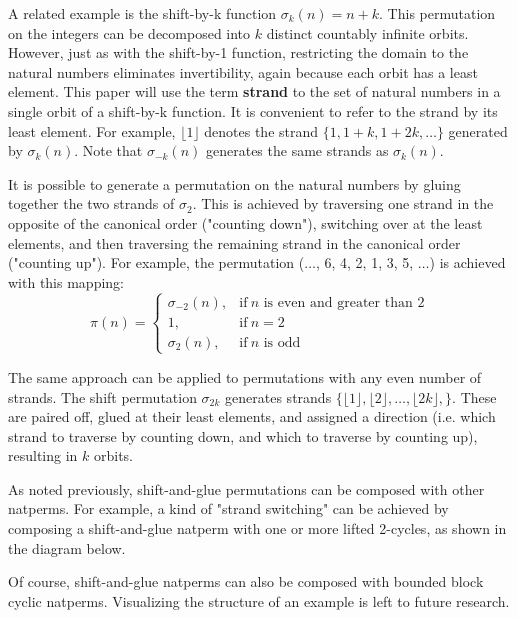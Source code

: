 \documentclass[12pt,reqno]{article}
\begin{document}
A related example is the shift-by-k function $\sigma_k(n) = n + k$. This permutation on the integers can be decomposed into $k$ distinct countably infinite orbits. However, just as with the shift-by-1 function, restricting the domain to the natural numbers eliminates invertibility, again because each orbit has a least element. This paper will use the term \textbf{strand} to the set of natural numbers in a single orbit of a shift-by-k function. It is convenient to refer to the strand by its least element. For example, $\lfloor 1 \rfloor$ denotes the strand $\{ 1, 1 + k, 1 + 2k, \ldots \}$ generated by $\sigma_k(n)$. Note that $\sigma_{-k}(n)$ generates the same strands as $\sigma_k(n)$.

It is possible to generate a permutation on the natural numbers by gluing together the two strands of $\sigma_2$. This is achieved by traversing one strand in the opposite of the canonical order ("counting down"), switching over at the least elements, and then traversing the remaining strand in the canonical order ("counting up"). For example, the permutation ($\ldots$, 6, 4, 2, 1, 3, 5, $\ldots$) is achieved with this mapping:
\begin{equation}
    \pi(n) = \begin{cases}
        \sigma_{-2}(n), & \text{if}\ n \text{ is even and greater than 2} \\
        1, & \text{if}\ n = 2 \\
        \sigma_2(n), & \text{if}\ n \text{ is odd} 
    \end{cases}
\end{equation}

The same approach can be applied to permutations with any even number of strands. The shift permutation $\sigma_{2k}$ generates strands $\{ \lfloor 1 \rfloor,  \lfloor 2 \rfloor, \ldots, \lfloor 2k \rfloor, \}$. These are paired off, glued at their least elements, and assigned a direction (i.e. which strand to traverse by counting down, and which to traverse by counting up), resulting in $k$ orbits.


As noted previously, shift-and-glue permutations can be composed with other natperms. For example, a kind of "strand switching" can be achieved by composing a shift-and-glue natperm with one or more lifted 2-cycles, as shown in the diagram below.


Of course, shift-and-glue natperms can also be composed with bounded block cyclic natperms. Visualizing the structure of an example is left to future research.
\end{document}
